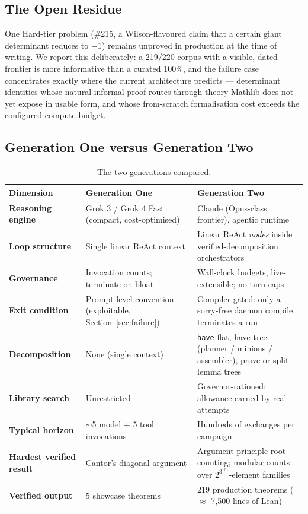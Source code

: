 \documentclass[12pt, a4paper]{article}
\begin{document}
\subsection{The Open Residue}

One Hard-tier problem (\#215, a Wilson-flavoured claim that a certain giant
determinant reduces to $-1$) remains unproved in production at the time of
writing. We report this deliberately: a 219/220 corpus with a visible,
dated frontier is more informative than a curated 100\%, and the failure
case concentrates exactly where the current architecture predicts ---
determinant identities whose natural informal proof routes through theory
Mathlib does not yet expose in usable form, and whose from-scratch
formalisation cost exceeds the configured compute budget.

\subsection{Generation One versus Generation Two}

\begin{table}[H]
  \centering
  \caption{The two generations compared.}
  \label{tab:gen-compare}
  \renewcommand{\arraystretch}{1.5}
  \begin{tabular}{>{\bfseries}p{3.2cm} p{5.4cm} p{6.0cm}}
    \toprule
    Dimension & Generation One & Generation Two \\
    \midrule
    Reasoning engine & Grok 3 / Grok 4 Fast (compact, cost-optimised) & Claude (Opus-class frontier), agentic runtime \\
    Loop structure & Single linear ReAct context & Linear ReAct \emph{nodes} inside verified-decomposition orchestrators \\
    Governance & Invocation counts; terminate on bloat & Wall-clock budgets, live-extensible; no turn caps \\
    Exit condition & Prompt-level convention (exploitable, Section~\ref{sec:failure}) & Compiler-gated: only a sorry-free daemon compile terminates a run \\
    Decomposition & None (single context) & \texttt{have}-flat, have-tree (planner / minions / assembler), prove-or-split lemma trees \\
    Library search & Unrestricted & Governor-rationed; allowance earned by real attempts \\
    Typical horizon & $\sim$5 model + 5 tool invocations & Hundreds of exchanges per campaign \\
    Hardest verified result & Cantor's diagonal argument & Argument-principle root counting; modular counts over $2^{3^{101}}$-element families \\
    Verified output & 5 showcase theorems & 219 production theorems ($\approx$ 7{,}500 lines of Lean) \\
    \bottomrule
  \end{tabular}
\end{table}
\end{document}
